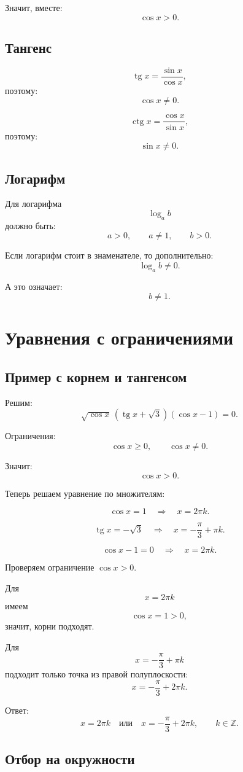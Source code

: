 \documentclass[a4paper,12pt]{article}
\providecommand{\tg}{\mathop{\mathrm{tg}}\nolimits}
\providecommand{\ctg}{\mathop{\mathrm{ctg}}\nolimits}
\begin{document}
Значит, вместе:
\[
\cos x>0.
\]

\subsection{Тангенс}

\[
\tg x=\frac{\sin x}{\cos x},
\]
поэтому:
\[
\cos x\ne0.
\]

\[
\ctg x=\frac{\cos x}{\sin x},
\]
поэтому:
\[
\sin x\ne0.
\]

\subsection{Логарифм}

Для логарифма
\[
\log_a b
\]
должно быть:
\[
a>0,\qquad a\ne1,\qquad b>0.
\]

Если логарифм стоит в знаменателе, то дополнительно:
\[
\log_a b\ne0.
\]

А это означает:
\[
b\ne1.
\]

\section{Уравнения с ограничениями}

\subsection{Пример с корнем и тангенсом}

Решим:
\[
\sqrt{\cos x}\,(\tg x+\sqrt3)(\cos x-1)=0.
\]

Ограничения:
\[
\cos x\ge0,
\qquad
\cos x\ne0.
\]

Значит:
\[
\cos x>0.
\]

Теперь решаем уравнение по множителям:

\[
\cos x=1
\quad\Rightarrow\quad
x=2\pi k.
\]

\[
\tg x=-\sqrt3
\quad\Rightarrow\quad
x=-\frac{\pi}{3}+\pi k.
\]

\[
\cos x-1=0
\quad\Rightarrow\quad
x=2\pi k.
\]

Проверяем ограничение $\cos x>0$.

Для
\[
x=2\pi k
\]
имеем
\[
\cos x=1>0,
\]
значит, корни подходят.

Для
\[
x=-\frac{\pi}{3}+\pi k
\]
подходит только точка из правой полуплоскости:
\[
x=-\frac{\pi}{3}+2\pi k.
\]

Ответ:
\[
x=2\pi k
\quad\text{или}\quad
x=-\frac{\pi}{3}+2\pi k,
\qquad k\in\mathbb Z.
\]

\subsection{Отбор на окружности}
\end{document}
